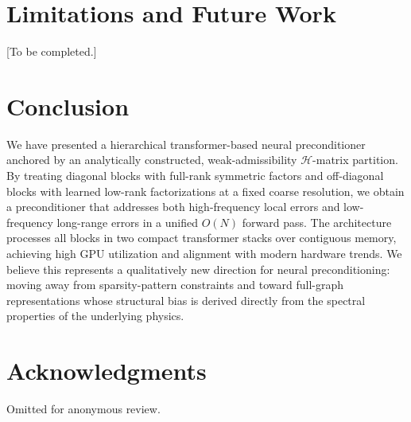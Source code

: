 \documentclass[acmtog,anonymous,review]{acmart}
\begin{document}
\section{Limitations and Future Work}
\label{sec:limitations}

[To be completed.]

\section{Conclusion}
\label{sec:conclusion}

We have presented a hierarchical transformer-based neural preconditioner anchored by an
analytically constructed, weak-admissibility $\mathcal{H}$-matrix partition.  By treating
diagonal blocks with full-rank symmetric factors and off-diagonal blocks with learned low-rank
factorizations at a fixed coarse resolution, we obtain a preconditioner that addresses both
high-frequency local errors and low-frequency long-range errors in a unified $O(N)$ forward pass.
The architecture processes all blocks in two compact transformer stacks over contiguous memory,
achieving high GPU utilization and alignment with modern hardware trends.  We believe this
represents a qualitatively new direction for neural preconditioning: moving away from
sparsity-pattern constraints and toward full-graph representations whose structural bias is derived
directly from the spectral properties of the underlying physics.

\section*{Acknowledgments}
Omitted for anonymous review.



\end{document}
